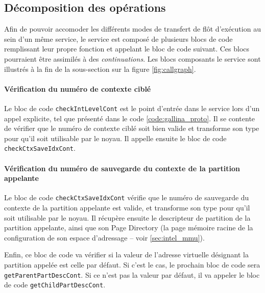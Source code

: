 		\subsection{Décomposition des opérations}

		Afin de pouvoir accomoder les différents modes de transfert de flôt d'exécution au sein d'un même service, le service est composé de plusieurs blocs de code remplissant leur propre fonction et appelant le bloc de code suivant. Ces blocs pourraient être assimilés à des \emph{continuations}. Les blocs composants le service sont illustrés à la fin de la sous-section sur la figure \ref{fig:callgraph}.

		\paragraph{Vérification du numéro de contexte ciblé}

		Le bloc de code \texttt{checkIntLevelCont} est le point d'entrée dans le service lors d'un appel explicite, tel que présenté dans le code \ref{code:gallina_proto}.
		Il se contente de vérifier que le numéro de contexte ciblé soit bien valide et transforme son type pour qu'il soit utilisable par le noyau. Il appelle ensuite le bloc de code \texttt{checkCtxSaveIdxCont}.


		\paragraph{Vérification du numéro de sauvegarde du contexte de la partition appelante}
		
		Le bloc de code \texttt{checkCtxSaveIdxCont} vérifie que le numéro de sauvegarde du contexte de la partition appelante est valide, et transforme son type pour qu'il soit utilisable par le noyau. Il récupère ensuite le descripteur de partition de la partition appelante, ainsi que son Page Directory (la page mémoire racine de la configuration de son espace d'adressage -- voir \ref{sec:intel_mmu}).

		Enfin, ce bloc de code va vérifier si la valeur de l'adresse virtuelle désignant la partition appelée est celle par défaut. Si c'est le cas, le prochain bloc de code sera \texttt{getParentPartDescCont}. Si ce n'est pas la valeur par défaut, il va appeler le bloc de code \texttt{getChildPartDescCont}.

